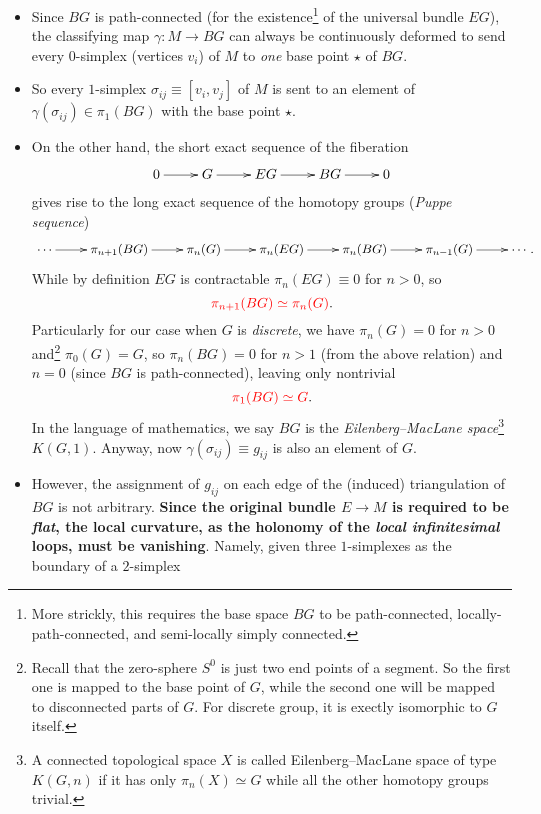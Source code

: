 \documentclass[10pt,nofootinbib,letterpaper]{revtex4}
\begin{document}
		\begin{itemize}
			\item Since $BG$ is path-connected (for the existence\footnote{More strickly, this requires the base space $BG$ to be path-connected, locally-path-connected, and semi-locally simply connected.} of the universal bundle $EG$), the classifying map $\gamma:M\to BG$ can always be continuously deformed to send every $0$-simplex (vertices $v_i$) of $M$ to \emph{one} base point $\star$ of $BG$.
			\item So every $1$-simplex $\sigma_{ij}\equiv[v_i,v_j]$ of $M$ is sent to an element of $\gamma(\sigma_{ij})\in\pi_1(BG)$ with the base point $\star$. 
			\item On the other hand, the short exact sequence of the fiberation
			\begin{equation*}
				\xymatrix{0\ar[r]&G\ar[r]&EG\ar[r]&BG\ar[r]&0}
			\end{equation*}
			gives rise to the long exact sequence of the homotopy groups (\emph{Puppe sequence})
			\begin{equation*}
				\xymatrix{\cdots\ar[r] & \pi_{n+1}(BG)\ar[r] & \pi_n(G)\ar[r] & \pi_n(EG)\ar[r] & \pi_n(BG)\ar[r] & \pi_{n-1}(G)\ar[r] &\cdots}.
			\end{equation*}
			While by definition $EG$ is contractable $\pi_n(EG)\equiv0$ for $n>0$, so
			\begin{equation*}
				{\color{red}\pi_{n+1}(BG)\simeq\pi_n(G)}.
			\end{equation*}
			Particularly for our case when $G$ is \emph{discrete}, we have $\pi_n(G)=0$ for $n>0$ and\footnote{Recall that the zero-sphere $S^0$ is just two end points of a segment. So the first one is mapped to the base point of $G$, while the second one will be mapped to disconnected parts of $G$. For discrete group, it is exectly isomorphic to $G$ itself.} $\pi_0(G)=G$, so $\pi_n(BG)=0$ for $n>1$ (from the above relation) and $n=0$ (since $BG$ is path-connected), leaving only nontrivial
			\begin{equation*}
				{\color{red}\pi_1(BG)\simeq G}.
			\end{equation*}
			In the language of mathematics, we say $BG$ is the \emph{Eilenberg–MacLane space}\footnote{A connected topological space $X$ is called Eilenberg–MacLane space of type $K(G,n)$ if it has only $\pi_n(X)\simeq G$ while all the other homotopy groups trivial.} $K(G,1)$. Anyway, now $\gamma(\sigma_{ij})\equiv g_{ij}$ is also an element of $G$.
			\item However, the assignment of $g_{ij}$ on each edge of the (induced) triangulation of $BG$ is not arbitrary. \textbf{Since the original bundle $E\to M$ is required to be \emph{flat}, the local curvature, as the holonomy of the \emph{local infinitesimal} loops, must be vanishing}. Namely, given three $1$-simplexes as the boundary of a $2$-simplex

\end{itemize}
\end{document}
